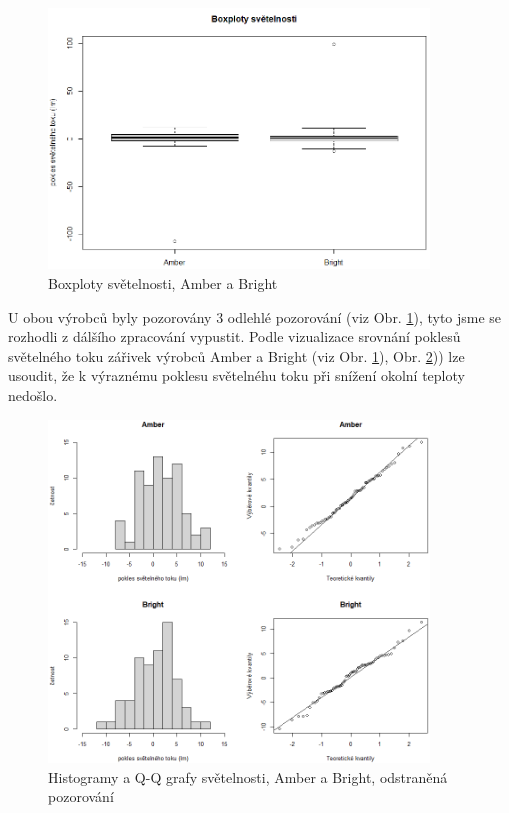 \documentclass[czech]{article}%
\begin{document}
\begin{figure}[H]
	\centering
	\includegraphics[width=0.9\textwidth]{Figures/Boxploty_2.png}
	\caption[Boxploty světelnosti, Amber a Bright]{Boxploty světelnosti, Amber a Bright}
	\label{fig:Boxplot2}
\end{figure}

U obou výrobců byly pozorovány 3 odlehlé pozorování (viz Obr. \ref{fig:Boxplot2}), tyto jsme se rozhodli z dálšího zpracování vypustit. 
Podle vizualizace srovnání poklesů světelného toku zářivek výrobců Amber a Bright (viz Obr. \ref{fig:Boxplot2}), Obr. \ref{fig:QQaHist_2})) lze usoudit, že k výraznému poklesu 
světelnéhu toku při snížení okolní teploty nedošlo.

\begin{figure}[H]
	\centering
	\includegraphics[width=0.9\textwidth]{Figures/QQaHistogram_2.png}
	\caption[Histogramy a Q-Q grafy světelnosti]{Histogramy a Q-Q grafy světelnosti, Amber a Bright, odstraněná pozorování}
	\label{fig:QQaHist_2}
\end{figure}
\end{document}
